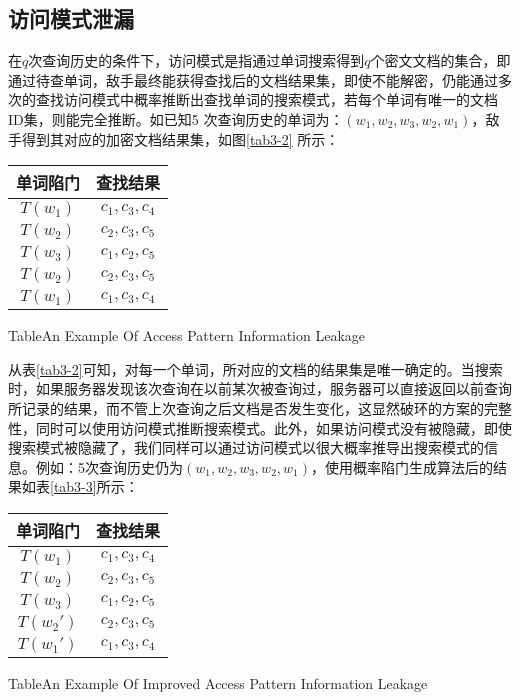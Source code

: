 \subsection{访问模式泄漏}
\label{sec:searchpattern_problem_definition_access_pattern}
在$q$次查询历史的条件下，访问模式是指通过单词搜索得到$q$个密文文档的集合，即通过待查单词，敌手最终能获得查找后的文档结果集，即使不能解密，仍能通过多次的查找访问模式中概率推断出查找单词的搜索模式，若每个单词有唯一的文档ID集，则能完全推断。如已知5 次查询历史的单词为：$(w_1, w_2, w_3, w_2, w_1)$，敌手得到其对应的加密文档结果集，如图\ref{tab3-2} 所示：
\begin{table}[h]
  \centering
  \begin{tabular}[t]{|c|c|}
    \hline
    单词陷门 &       查找结果 \\
    \hline
    $T(w_1)$ & $c_1, c_3, c_4$ \\
    \hline
    $T(w_2)$ & $c_2, c_3, c_5$ \\
    \hline
    $T(w_3)$ & $c_1, c_2, c_5$ \\
    \hline
    $T(w_2)$ & $c_2, c_3, c_5$  \\
    \hline
    $T(w_1)$ & $c_1, c_3, c_4$  \\
    \hline
  \end{tabular}
  {Table}{An Example Of Access Pattern Information Leakage}
\end{table}

从表\ref{tab3-2}可知，对每一个单词，所对应的文档的结果集是唯一确定的。当搜索时，如果服务器发现该次查询在以前某次被查询过，服务器可以直接返回以前查询所记录的结果，而不管上次查询之后文档是否发生变化，这显然破环的方案的完整性，同时可以使用访问模式推断搜索模式。此外，如果访问模式没有被隐藏，即使搜索模式被隐藏了，我们同样可以通过访问模式以很大概率推导出搜索模式的信息。例如：5次查询历史仍为$(w_1, w_2, w_3, w_2, w_1)$，使用概率陷门生成算法后的结果如表\ref{tab3-3}所示：
\begin{table}[h]
  \centering
  \begin{tabular}[t]{|c|c|}
    \hline
    单词陷门 &       查找结果 \\
    \hline
    $T(w_1)$ & $c_1, c_3, c_4$ \\
    \hline
    $T(w_2)$ & $c_2, c_3, c_5$  \\
    \hline
    $T(w_3)$ & $c_1, c_2, c_5$  \\
    \hline
    $T(w_2')$ & $c_2, c_3, c_5$  \\
    \hline
    $T(w_1')$ & $c_1, c_3, c_4$  \\
    \hline
  \end{tabular}
  {Table}{An Example Of Improved Access Pattern Information Leakage}
\end{table}

